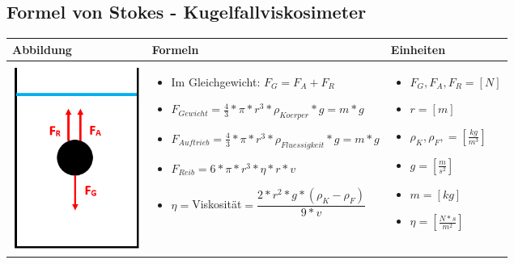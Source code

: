 \subsection{Formel von Stokes - Kugelfallviskosimeter}				%
\begin{table}[h!]
	\begin{tabular}{ | m{4cm} | m{10cm} | m{4cm} | }
		\hline
		Abbildung & Formeln & Einheiten \\ \hline
		\midrule
		\begin{minipage}{.3\textwidth}
			\includegraphics[width=4.2cm]{Figures/Stokes}
		\end{minipage}
		&
		\begin{itemize}
			\item Im Gleichgewicht: $F_{G}=F_{A}+F_{R}$	
			\item $F_{Gewicht}=\frac{4}{3}*\pi *r^{3}* \rho_{Koerper} *g=m*g$	 
			\item $F_{Auftrieb}=\frac{4}{3}*\pi *r^{3}* \rho_{Fluessigkeit} *g=m*g$
			\item $F_{Reib}=6*\pi *r^{3}* \eta*r*v$	
			\item $\eta=$Viskosität$=\dfrac{2*r^{2}*g*(\rho_{K}-\rho_{F})}{9*v}$
		\end{itemize}
		& 
		\begin{itemize}
			\item $F_{G},F_{A},F_{R}=[N]$
			\item $r=[m]$	
			\item $\rho_{K},\rho_{F},=[\frac{kg}{m^3}]$	
			\item $g=[\frac{m}{s^{2}}]$
			\item $m=[kg]$
			\item $\eta=[\frac{N*s}{m^{2}}]$
		\end{itemize}
		\\ \hline
	\end{tabular}
\end{table}

